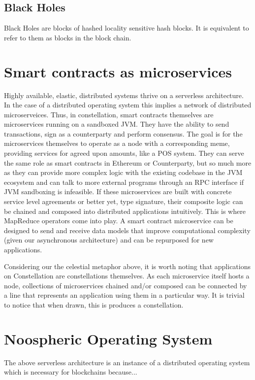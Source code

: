 \documentclass{article}
\begin{document}
\subsection{Black Holes}
Black Holes are blocks of hashed locality sensitive hash blocks. It is equivalent to refer to them as blocks in the block chain.

\section{Smart contracts as microservices}
Highly available, elastic, distributed systems thrive on a serverless architecture. In the case of a distributed operating system this implies a network of distributed microserveices. Thus, in constellation, smart contracts themselves are microservices running on a sandboxed JVM. They have the ability to send transactions, sign as a counterparty and perform consensus. The goal is for the microservices themselves to operate as a node with a corresponding meme, providing services for agreed upon amounts, like a POS system. They can serve the same role as smart contracts in Ethereum or Counterparty, but so much more as they can provide more complex logic with the existing codebase in the JVM ecosystem and can talk to more external programs through an RPC interface if JVM sandboxing is infeasible. If these microservices are built with concrete service level agreements or better yet, type signature, their composite logic can be chained and composed into distributed applications intuitively. This is where MapReduce operators come into play. A smart contract microservice can be designed to send and receive data models that improve computational complexity (given our asynchronous architecture) and can be repurposed for new applications. 

Considering our the celestial metaphor above, it is worth noting that applications on Constellation are constellations themselves. As each microservice itself hosts a node, collections of microservices chained and/or composed can be connected by a line that represents an application using them in a particular way. It is trivial to notice that when drawn, this is produces a constellation.

\section{Noospheric Operating System}
The above serverless architecture is an instance of a distributed operating system which is necessary for blockchains because...
\end{document}
